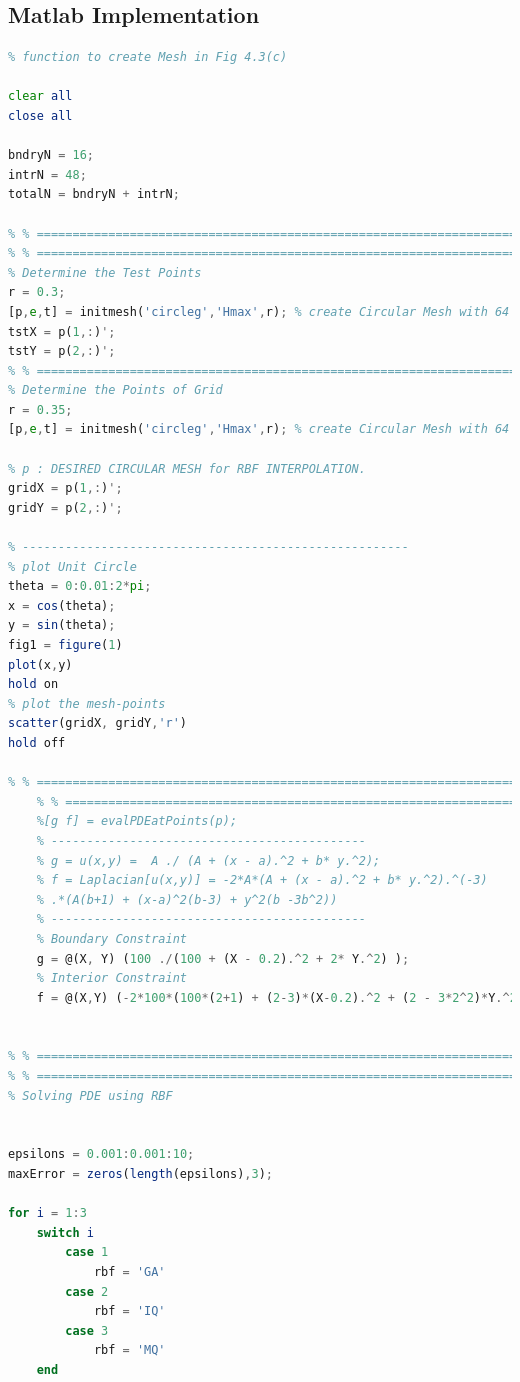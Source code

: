 \documentclass[11pt]{article}
\begin{document}
\subsection{Matlab Implementation}
\begin{lstlisting}[language=octave]
% Code to reproduce Fig 4.4(a) using Matlab PDE Toolbox - Mesh Generating
% function to create Mesh in Fig 4.3(c)

clear all
close all

bndryN = 16;
intrN = 48;
totalN = bndryN + intrN;

% % =======================================================================
% % =======================================================================
% Determine the Test Points 
r = 0.3;
[p,e,t] = initmesh('circleg','Hmax',r); % create Circular Mesh with 64 points
tstX = p(1,:)';
tstY = p(2,:)';
% % =======================================================================
% Determine the Points of Grid
r = 0.35;
[p,e,t] = initmesh('circleg','Hmax',r); % create Circular Mesh with 64 points

% p : DESIRED CIRCULAR MESH for RBF INTERPOLATION.
gridX = p(1,:)';
gridY = p(2,:)';

% ------------------------------------------------------
% plot Unit Circle
theta = 0:0.01:2*pi;
x = cos(theta);
y = sin(theta);
fig1 = figure(1)
plot(x,y)
hold on
% plot the mesh-points
scatter(gridX, gridY,'r')
hold off

% % =======================================================================
    % % =======================================================================
    %[g f] = evalPDEatPoints(p);
    % --------------------------------------------
    % g = u(x,y) =  A ./ (A + (x - a).^2 + b* y.^2);
    % f = Laplacian[u(x,y)] = -2*A*(A + (x - a).^2 + b* y.^2).^(-3)
    % .*(A(b+1) + (x-a)^2(b-3) + y^2(b -3b^2))
    % --------------------------------------------
    % Boundary Constraint
    g = @(X, Y) (100 ./(100 + (X - 0.2).^2 + 2* Y.^2) );
    % Interior Constraint
    f = @(X,Y) (-2*100*(100*(2+1) + (2-3)*(X-0.2).^2 + (2 - 3*2^2)*Y.^2).*(100 + (X - 0.2).^2 + 2*Y.^2).^(-3));
    
    
% % =======================================================================
% % =======================================================================
% Solving PDE using RBF
        

epsilons = 0.001:0.001:10;
maxError = zeros(length(epsilons),3);

for i = 1:3
    switch i
        case 1
            rbf = 'GA'
        case 2
            rbf = 'IQ'
        case 3 
            rbf = 'MQ'
    end


\end{lstlisting}
\end{document}
